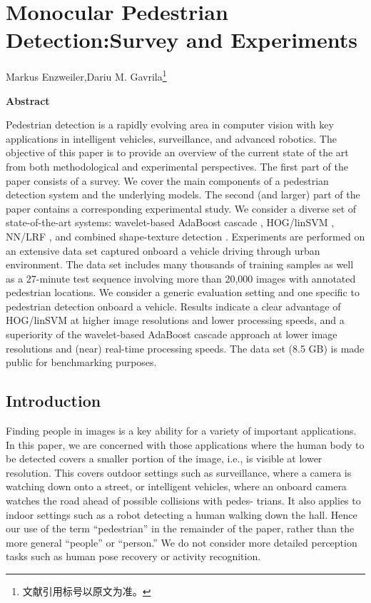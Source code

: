 \chapter{Monocular Pedestrian Detection:Survey and Experiments}
\begin{center}
    Markus Enzweiler,Dariu M. Gavrila\footnote{文献引用标号以原文为准。}
\end{center}
\begin{center}
    \textbf{Abstract}
\end{center}

Pedestrian detection is a rapidly evolving area in computer vision with key applications in intelligent vehicles, surveillance,
and advanced robotics. The objective of this paper is to provide an overview of the current state of the art from both methodological
and experimental perspectives. The first part of the paper consists of a survey. We cover the main components of a pedestrian
detection system and the underlying models. The second (and larger) part of the paper contains a corresponding experimental study.
We consider a diverse set of state-of-the-art systems: wavelet-based AdaBoost cascade , HOG/linSVM , NN/LRF , and
combined shape-texture detection . Experiments are performed on an extensive data set captured onboard a vehicle driving
through urban environment. The data set includes many thousands of training samples as well as a 27-minute test sequence involving
more than 20,000 images with annotated pedestrian locations. We consider a generic evaluation setting and one specific to pedestrian
detection onboard a vehicle. Results indicate a clear advantage of HOG/linSVM at higher image resolutions and lower processing
speeds, and a superiority of the wavelet-based AdaBoost cascade approach at lower image resolutions and (near) real-time
processing speeds. The data set (8.5 GB) is made public for benchmarking purposes.
\section{Introduction}
Finding 
people in images is a key ability for a variety of
important applications. In this paper, we are concerned
with those applications where the human body to be
detected covers a smaller portion of the image, i.e., is visible
at lower resolution. This covers outdoor settings such as
surveillance, where a camera is watching down onto a
street, or intelligent vehicles, where an onboard camera
watches the road ahead of possible collisions with pedes-
trians. It also applies to indoor settings such as a robot
detecting a human walking down the hall. Hence our use of
the term “pedestrian” in the remainder of the paper, rather
than the more general “people” or “person.” We do not
consider more detailed perception tasks such as human
pose recovery or activity recognition.

